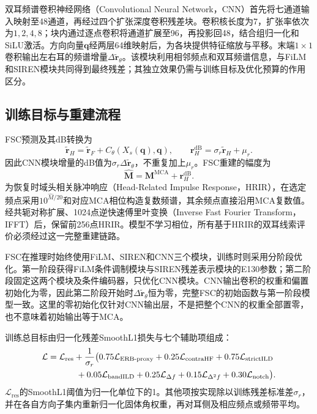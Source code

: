 \documentclass[UTF8,a4paper]{article}
\begin{document}
双耳频谱卷积神经网络（Convolutional Neural Network，CNN）首先将七通道输入映射至48通道，再经过四个扩张深度卷积残差块。卷积核长度为7，扩张率依次为$1,2,4,8$；块内通过逐点卷积将通道扩展至96，再投影回48，结合组归一化和SiLU激活。方向向量$\mathbf q$经两层64维映射后，为各块提供特征缩放与平移。末端$1\times1$卷积输出左右耳的频谱增量$\Delta\widetilde{\mathbf r}_\theta$。该模块利用相邻频点和双耳频谱信息，与FiLM和SIREN模块共同得到最终残差；其独立效果仍需与训练目标及优化预算的作用区分。

\subsection{训练目标与重建流程}
FSC预测及其dB转换为
\begin{equation}
\widetilde{\mathbf r}_H=\widetilde{\mathbf r}_F+
C_\theta(X_s(\mathbf q),\mathbf q),\qquad
\mathbf r_H^{\mathrm{dB}}=\sigma_r\widetilde{\mathbf r}_H+\mu_r.
\end{equation}
因此CNN模块增量的dB值为$\sigma_r\Delta\widetilde{\mathbf r}_\theta$，不重复加上$\mu_r$。FSC重建的幅度为
\begin{equation}
\widehat{\mathbf M}=\mathbf M^{\mathrm{MCA}}+
\mathbf r_H^{\mathrm{dB}}.
\end{equation}
为恢复时域头相关脉冲响应（Head-Related Impulse Response，HRIR），在选定频点采用$10^{\widehat M/20}$和对应MCA相位构造复数频谱，其余频点直接沿用MCA复数值。经共轭对称扩展、1024点逆快速傅里叶变换（Inverse Fast Fourier Transform，IFFT）后，保留前256点HRIR。模型不学习相位，所有基于HRIR的双耳线索评价必须经过这一完整重建链路。

FSC在推理时始终使用FiLM、SIREN和CNN三个模块，训练时则采用分阶段优化。第一阶段获得FiLM条件调制模块与SIREN残差表示模块的E130参数；第二阶段固定这两个模块及条件编码器，只优化CNN模块。CNN输出卷积的权重和偏置初始化为零，因此第二阶段开始时$\Delta\widetilde{\mathbf r}_\theta$恒为零，完整FSC的初始函数与第一阶段模型一致。这里的零初始化仅针对CNN输出层，不是把整个CNN的权重全部置零，也不意味着初始输出等于MCA。

训练总目标由归一化残差SmoothL1损失与七个辅助项组成：
\begin{align}
\mathcal L={}&\mathcal L_{\mathrm{res}}+
\frac{1}{\sigma_r}\big(
0.75\mathcal L_{\mathrm{ERB\text{-}proxy}}+
0.25\mathcal L_{\mathrm{contraHF}}+
0.75\mathcal L_{\mathrm{strictILD}}\notag\\
&\qquad+
0.05\mathcal L_{\mathrm{bandILD}}+
0.25\mathcal L_{\Delta f}+
0.15\mathcal L_{\Delta^2 f}+
0.30\mathcal L_{\mathrm{notch}}\big).
\label{eq:training-loss}
\end{align}
$\mathcal L_{\mathrm{res}}$的SmoothL1阈值为归一化单位下的1。其他项按实现除以训练残差标准差$\sigma_r$，并在各自方向子集内重新归一化固体角权重，再对耳侧及相应频点或频带平均。
\end{document}
